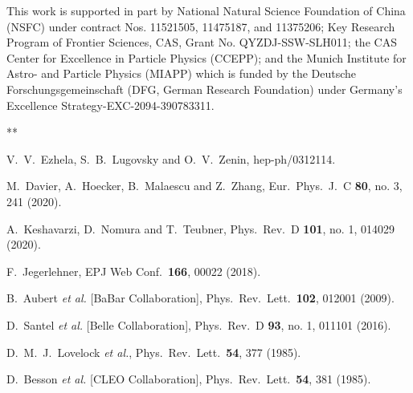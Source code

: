 \documentclass[aps,showpacs,superscriptaddress,preprint,tightenlines]{revtex4}
\begin{document}
\acknowledgments

This work is supported in part by National Natural Science Foundation 
of China (NSFC) under contract Nos. 11521505, 11475187, and 11375206; 
Key Research Program of Frontier Sciences, CAS, Grant No. QYZDJ-SSW-SLH011; 
the CAS Center for Excellence in Particle Physics (CCEPP); and the 
Munich Institute for Astro- and Particle Physics (MIAPP) which is funded 
by the Deutsche Forschungsgemeinschaft (DFG, German Research Foundation) 
under Germany's Excellence Strategy-EXC-2094-390783311.

\begin{thebibliography}{**}

  V.~V.~Ezhela, S.~B.~Lugovsky and O.~V.~Zenin,
  hep-ph/0312114.

  M.~Davier, A.~Hoecker, B.~Malaescu and Z.~Zhang,
  Eur.\ Phys.\ J.\ C {\bf 80}, no. 3, 241 (2020).

  A.~Keshavarzi, D.~Nomura and T.~Teubner,
  Phys.\ Rev.\ D {\bf 101}, no. 1, 014029 (2020).

  F.~Jegerlehner,
  EPJ Web Conf.\  {\bf 166}, 00022 (2018).

  B.~Aubert {\it et al.} [BaBar Collaboration],
  Phys.\ Rev.\ Lett.\  {\bf 102}, 012001 (2009).

  D.~Santel {\it et al.} [Belle Collaboration],
  Phys.\ Rev.\ D {\bf 93}, no. 1, 011101 (2016).

  D.~M.~J.~Lovelock {\it et al.},
  Phys.\ Rev.\ Lett.\  {\bf 54}, 377 (1985).

  D.~Besson {\it et al.} [CLEO Collaboration],
  Phys.\ Rev.\ Lett.\  {\bf 54}, 381 (1985).


\end{thebibliography}
\end{document}
